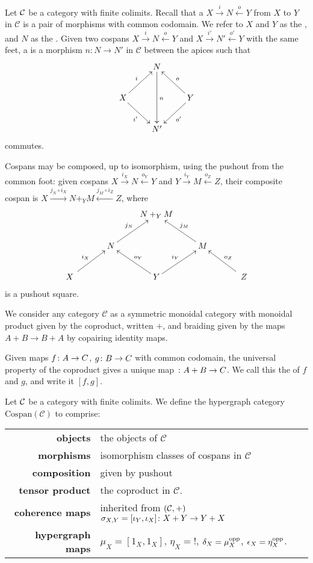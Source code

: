   Let $\mathcal C$ be a category with finite colimits.
Recall that a  $X \stackrel{i}{\longrightarrow} N
\stackrel{o}{\longleftarrow} Y$  from $X$ to $Y$ in $\mathcal C$ is a pair of
morphisms with common codomain. We refer to $X$ and $Y$ as the ,
and $N$ as the .  Given two cospans $X
\stackrel{i}{\longrightarrow} N \stackrel{o}{\longleftarrow} Y$ and $X
\stackrel{i'}{\longrightarrow} N' \stackrel{o'}{\longleftarrow} Y$ with the same
feet, a  is a morphism $n\colon  N \to N'$ in $\mathcal
C$ between the apices such that
\[
  \xymatrix{
    & N \ar[dd]^n  \\
    X \ar[ur]^{i} \ar[dr]_{i'} && Y \ar[ul]_{o} \ar[dl]^{o'}\\
    & N'
  }
\]
commutes.

Cospans may be composed, up to isomorphism, using the pushout from the common
foot: given cospans $X \stackrel{i_X}{\longrightarrow} N
\stackrel{o_Y}{\longleftarrow} Y$ and $Y \stackrel{i_Y}{\longrightarrow} M
\stackrel{o_Z}{\longleftarrow} Z$, their composite cospan is $X \stackrel{j_N
  \circ i_X}{\longrightarrow} N+_YM \stackrel{j_M\circ i_Z}{\longleftarrow} Z$,
  where 
\[
  \xymatrix{
    && N+_YM \\
    & N \ar[ur]^{j_N} && M \ar[ul]_{j_M} \\
    \quad X \quad \ar[ur]^{i_X} && Y \ar[ul]_{o_Y} \ar[ur]^{i_Y} && \quad Z \quad \ar[ul]_{o_Z}
  }
\]
is a pushout square. 

We consider any category $\mathcal C$ as a symmetric monoidal category with
monoidal product given by the coproduct, written $+$, and braiding given by the
maps $A+B \to B+A$ by copairing identity maps. 

Given maps $f {\colon} A \to C$, $g {\colon} B \to C$ with common codomain, the
universal property of the coproduct gives a unique map ${\colon} A+B \to C$. We
call this the  of $f$ and $g$, and write it $[f,g]$. 

\begin{definition} \label{thm.cospanwelldef}
  Let $\mathcal C$ be a category with finite colimits. We define the hypergraph
  category $\mathrm{Cospan}(\mathcal C)$ to comprise:
  
  \begin{tabular}{ r p{}}
    \textbf{objects} & the objects of $\mathcal C$ \\ 
    \textbf{morphisms} & isomorphism classes of cospans in
    $\mathcal C$\\ 
  \textbf{composition} & given by pushout \\
  \textbf{tensor product} & the coproduct in $\mathcal C$. \\
  \textbf{coherence maps} & inherited from $(\mathcal C,+)$ $\sigma_{X,Y} = [\iota_Y,\iota_X] {\colon} X+Y
      \to Y+X$\\
  \textbf{hypergraph maps} & $\mu_X = [1_X,1_X]$, $\eta_X = !$,
      $\delta_X = \mu_X^{\mathrm{opp}}$, $\epsilon_X = \eta_X^{\mathrm{opp}}$.
  \end{tabular}
\end{definition}


